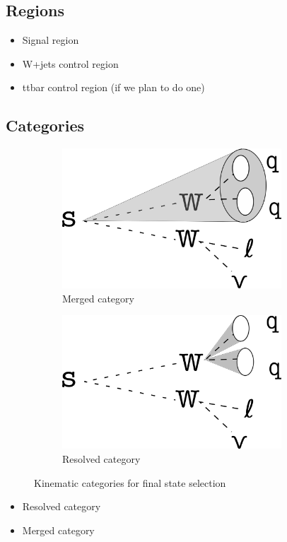 \documentclass[12pt]{article}
\begin{document}
\subsection{Regions}
\begin{itemize}
\item Signal region
\item W+jets control region
\item ttbar control region (if we plan to do one)
\end{itemize}
\subsection{Categories}
\begin{figure}[H]
     \centering
     \begin{subfigure}[b]{0.4\textwidth}
         \centering
         \includegraphics[width=0.9\textwidth]{figures/merged.png}
         \caption{Merged category}
         \label{fig:merged}
     \end{subfigure}
     \hfill
     \begin{subfigure}[b]{0.4\textwidth}
         \centering
         \includegraphics[width=0.9\textwidth]{figures/resolved.png}
         \caption{Resolved category}
         \label{fig:resolved}
     \end{subfigure}
\caption{Kinematic categories for final state selection}
\label{fig:categories}
\end{figure}
\begin{itemize}
\item Resolved category
\item Merged category
\end{itemize}
\end{document}
